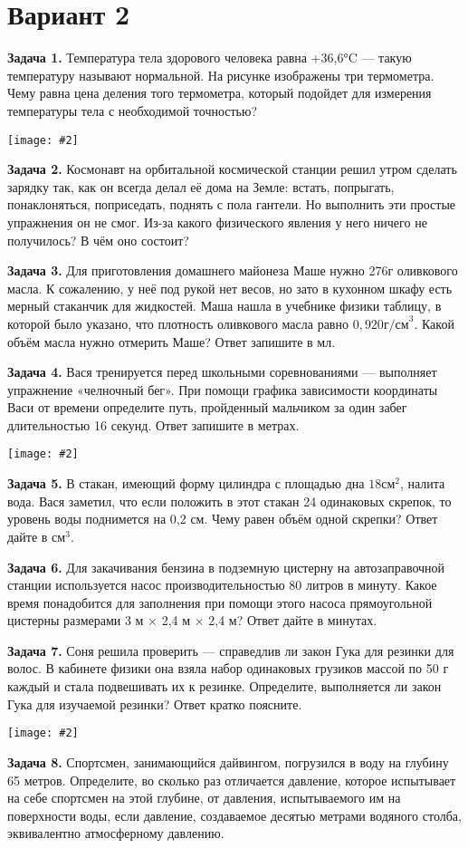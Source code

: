 \documentclass{article}
\newcommand{\pdt}[1]{
	\par
	\begin{minipage}{.95\linewidth}
	\setlength{\parindent}{2em}
	{#1}
	\end{minipage}
	\linebreak
}
\newcommand{\pdtpr}[4]{
	\par
	\begin{minipage}{#3\linewidth}
	\setlength{\parindent}{2em}
	{#1}
	\end{minipage}
	\begin{minipage}{#4\linewidth}
	{\texttt{[image: \#2]}}
	\end{minipage}
	\linebreak
}
\begin{document}
\section*{Вариант 2}
\noindent
\pdtpr{
\Large\textbf{Задача 1.}
 {Температура тела здорового человека равна +36,6°C — такую температуру называют нормальной. На рисунке изображены три термометра. Чему равна цена деления того термометра, который подойдет для измерения температуры тела с необходимой точностью?}
}
{temp.png}{.55}{.4}
\pdt{
\Large\textbf{Задача 2.}
{Космонавт на орбитальной космической станции решил утром сделать зарядку так, как он всегда делал её дома на Земле: встать, попрыгать, понаклоняться, поприседать, поднять с пола гантели. Но выполнить эти простые упражнения он не смог. Из-за какого физического явления у него ничего не получилось? В чём оно состоит?}
}
\linebreak
\pdt{
\Large\textbf{Задача 3.}
{Для приготовления домашнего майонеза Маше нужно 276г оливкового масла. К сожалению, у неё под рукой нет весов, но зато в кухонном шкафу есть мерный стаканчик для жидкостей. Маша нашла в учебнике физики таблицу, в которой было указано, что плотность оливкового масла равно $0,920\text{г/см}^{3}$. Какой объём масла нужно отмерить Маше? Ответ запишите в мл.}
}
\linebreak
\pdtpr
{\Large\textbf{Задача 4.}
{Вася тренируется перед школьными соревнованиями — выполняет упражнение «челночный бег». При помощи графика зависимости координаты Васи от времени определите путь, пройденный мальчиком за один забег длительностью 16 секунд. Ответ запишите в метрах.}
}{cheln.png}{.6}{.35}
\linebreak
\pdt{
\Large\textbf{Задача 5.}
{В стакан, имеющий форму цилиндра с площадью дна $18 \text{см}^{2}$, налита вода. Вася заметил, что если положить в этот стакан 24 одинаковых скрепок, то уровень воды поднимется на 0,2 см. Чему равен объём одной скрепки? Ответ дайте в $\text{см}^{3}$.}
}
\linebreak
\pdt{
\Large\textbf{Задача 6.}
 {Для закачивания бензина в подземную цистерну на автозаправочной станции используется насос производительностью 80 литров в минуту. Какое время понадобится для заполнения при помощи этого насоса прямоугольной цистерны размерами 3 м × 2,4 м × 2,4 м? Ответ дайте в минутах.}
 }
\linebreak

\pdtpr{
\Large\textbf{Задача 7.}
{Соня решила проверить — справедлив ли закон Гука для резинки для волос. В кабинете физики она взяла набор одинаковых грузиков массой по 50 г каждый и стала подвешивать их к резинке. Определите, выполняется ли закон Гука для изучаемой резинки? Ответ кратко поясните.}}
{guk2.png}{.5}{.45}
\linebreak
\pdt{
\Large\textbf{Задача 8.}
{Спортсмен, занимающийся дайвингом, погрузился в воду на глубину 65 метров. Определите, во сколько раз отличается давление, которое испытывает на себе спортсмен на этой глубине, от давления, испытываемого им на поверхности воды, если давление, создаваемое десятью метрами водяного столба, эквивалентно атмосферному давлению.
}}
\end{document}
